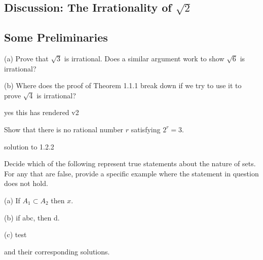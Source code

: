 \documentclass[12pt]{article}
\theoremstyle{definition}
\begin{document}
\subsection{Discussion: The Irrationality of \texorpdfstring{\( \sqrt{2} \)}{Root 2}} 





\subsection{Some Preliminaries}


\begin{exercise}
    \indent
    (a) Prove that \( \sqrt{3} \) is irrational. Does a similar argument work to show \( \sqrt{6} \) is irrational?

    (b) Where does the proof of Theorem 1.1.1\footnotemark{} break down if we try to use it to prove \( \sqrt{4} \) is irrational?
\end{exercise}

\begin{solution}
    yes this has rendered v2
\end{solution}



\begin{exercise}
    Show that there is no rational number \( r \) satisfying \( 2^{r} = 3 \).
\end{exercise}

\begin{solution}
    solution to 1.2.2
\end{solution}




\begin{exercise}
    Decide which of the following represent true statements about the nature of sets. For any that are false, provide a specific example where the statement in question does not hold.

    (a) If \( A_{1} \subset A_{2} \) then \( x \).

    (b) if abc, then d.     

    (c) test
\end{exercise}

\begin{solution}
    and their corresponding solutions.
\end{solution}
\end{document}
